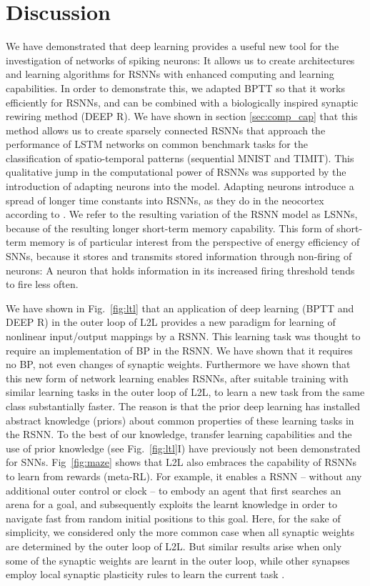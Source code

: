 \documentclass{article} \pdfoutput=1
\begin{document}
\section{Discussion}

We have demonstrated that deep learning provides a useful new tool for the investigation of networks of spiking neurons:
It allows us to create architectures and learning algorithms for RSNNs with enhanced computing and learning capabilities.
In order to demonstrate this, we adapted BPTT so that it works efficiently for RSNNs, and can be combined with a biologically inspired synaptic rewiring method (DEEP R). We have shown in section \ref{sec:comp_cap} that this method allows us to create sparsely connected RSNNs that approach the performance of LSTM networks on common benchmark tasks for the classification of spatio-temporal patterns (sequential MNIST and TIMIT). This qualitative jump in the computational power of RSNNs was supported by the introduction of adapting neurons into the model. Adapting neurons introduce a spread of longer time constants into RSNNs, as they do in the neocortex according to \cite{allen-featuresearch}. We refer to the resulting variation of the RSNN model as LSNNs, because of the resulting longer short-term memory capability. This form of short-term memory is of particular interest from the perspective of energy efficiency of SNNs, because it stores and transmits stored information through non-firing of neurons: A neuron that holds information in its increased firing threshold tends to fire less often.

We have shown in Fig.~\ref{fig:ltl} that an application of deep learning (BPTT and DEEP R) in the outer loop of L2L provides a new paradigm for learning of nonlinear input/output mappings by a RSNN. This learning task was thought to require an implementation of BP in the RSNN. We have shown that it requires no BP, not even changes of synaptic weights.
Furthermore we have shown that this new form of network learning enables RSNNs, after suitable training with similar learning tasks in the outer loop of L2L, to learn a new task from the same class substantially faster. The reason is that the prior deep learning has installed abstract knowledge (priors) about common properties of these learning tasks in the RSNN.
To the best of our knowledge, transfer learning capabilities and the use of prior knowledge (see Fig.~\ref{fig:ltl}I) have previously not been demonstrated for SNNs.
Fig~\ref{fig:maze} shows that L2L also embraces the capability of RSNNs to learn from rewards (meta-RL).
For example, it enables a RSNN -- without any additional outer control or clock -- to embody an agent that first searches an arena for a goal, and subsequently exploits the learnt knowledge in order to navigate fast from random initial positions to this goal.
Here, for the sake of simplicity, we considered only the more common case when all synaptic weights are determined by the outer loop of L2L. But similar results arise when only some of the synaptic weights are learnt in the outer loop, while other synapses employ local synaptic plasticity rules to learn the current task \cite{subramoney_etal_2018}.
\end{document}

